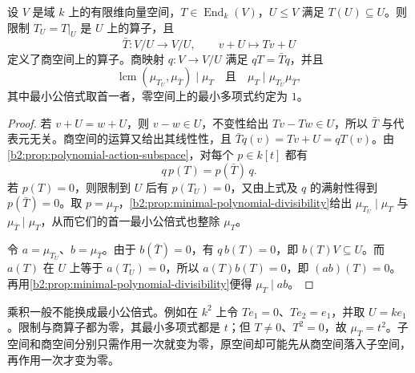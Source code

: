 \begin{proposition}\label{b2:prop:restriction-quotient-polynomials}
	设 \(V\) 是域 \(k\) 上的有限维向量空间，\(T\in\operatorname{End}_k(V)\)，\(U\le V\) 满足 \(T(U)\subseteq U\)。则限制 \(T_U=T|_U\) 是 \(U\) 上的算子，且
	\[
		\bar T:V/U\longrightarrow V/U,\qquad v+U\longmapsto Tv+U
	\]
	定义了商空间上的算子。商映射 \(q:V\to V/U\) 满足 \(qT=\bar Tq\)，并且
	\[
		\operatorname{lcm}(\mu_{T_U},\mu_{\bar T})\mid \mu_T \quad\text{且}\quad \mu_T\mid \mu_{T_U}\mu_{\bar T},
	\]
	其中最小公倍式取首一者，零空间上的最小多项式约定为 \(1\)。
\end{proposition}
\begin{proof}
	若 \(v+U=w+U\)，则 \(v-w\in U\)，不变性给出 \(Tv-Tw\in U\)，所以 \(\bar T\) 与代表元无关。商空间的运算又给出其线性性，且 \(\bar Tq(v)=Tv+U=qT(v)\)。由\cref{b2:prop:polynomial-action-subspace}，对每个 \(p\in k[t]\) 都有
	\[
		q\,p(T)=p(\bar T)\,q.
	\]
	若 \(p(T)=0\)，则限制到 \(U\) 后有 \(p(T_U)=0\)，又由上式及 \(q\) 的满射性得到 \(p(\bar T)=0\)。取 \(p=\mu_T\)，\cref{b2:prop:minimal-polynomial-divisibility}给出 \(\mu_{T_U}\mid \mu_T\) 与 \(\mu_{\bar T}\mid \mu_T\)，从而它们的首一最小公倍式也整除 \(\mu_T\)。

	令 \(a=\mu_{T_U}\)、\(b=\mu_{\bar T}\)。由于 \(b(\bar T)=0\)，有 \(q\,b(T)=0\)，即 \(b(T)V\subseteq U\)。而 \(a(T)\) 在 \(U\) 上等于 \(a(T_U)=0\)，所以 \(a(T)b(T)=0\)，即 \((ab)(T)=0\)。再用\cref{b2:prop:minimal-polynomial-divisibility}便得 \(\mu_T\mid ab\)。
\end{proof}

乘积一般不能换成最小公倍式。例如在 \(k^2\) 上令 \(Te_1=0\)、\(Te_2=e_1\)，并取 \(U=ke_1\)。限制与商算子都为零，其最小多项式都是 \(t\)；但 \(T\ne0\)、\(T^2=0\)，故 \(\mu_T=t^2\)。子空间和商空间分别只需作用一次就变为零，原空间却可能先从商空间落入子空间，再作用一次才变为零。
